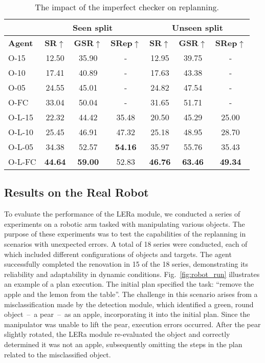 \documentclass[letterpaper, 10 pt, conference]{ieeeconf}  %
\begin{document}
\begin{table}
\caption{The impact of the imperfect checker on replanning.}
\centering
\small
\begin{tabular}{lcccccc}
\toprule
& \multicolumn{3}{c}{\textbf{Seen split}} & \multicolumn{3}{c}{\textbf{Unseen split}} \\ \toprule
\textbf{Agent} & \textbf{SR$\uparrow$} & \textbf{GSR$\uparrow$} & \textbf{SRep$\uparrow$} & \textbf{SR$\uparrow$} & \textbf{GSR$\uparrow$} & \textbf{SRep$\uparrow$} \\
\midrule
O-15 & 12.50 & 35.90 & - & 12.95 & 39.75 & - \\
O-10 & 17.41 & 40.89 & - & 17.63 & 43.38 & - \\
O-05 & 24.55 & 45.01 & - & 24.82 & 47.54 & - \\
O-FC   & 33.04  & 50.04 & - & 31.65 & 51.71 & - \\ \midrule
O-L-15   & 22.32 & 44.42 & 35.48 & 20.50 & 45.29 & 25.00 \\
O-L-10   & 25.45 & 46.91 & 47.32 & 25.18 & 48.95 & 28.70 \\
O-L-05   & 34.38 & 52.57 & \textbf{54.16} & 35.97 & 55.76 & 35.43 \\
O-L-FC     & \textbf{44.64} & \textbf{59.00} & 52.83 & \textbf{46.76} & \textbf{63.46} & \textbf{49.34} \\ \bottomrule
\end{tabular}
\label{tab:not_ideal_checkers}
\vspace{-20pt}
\end{table}


\subsection{Results on the Real Robot}
To evaluate the performance of the LERa module, we conducted a series of experiments on a robotic arm tasked with manipulating various objects. The purpose of these experiments was to test the capabilities of the replanning in scenarios with unexpected  errors. A total of 18 series were conducted, each of which included different configurations of objects and targets. The agent successfully completed the renovation in 15 of the 18 series, demonstrating its reliability and adaptability in dynamic conditions.
Fig.~\ref{fig:robot_run} illustrates an example of a plan execution. The initial plan specified the task: ``remove the apple and the lemon from the table''. The challenge in this scenario arises from a misclassification made by the detection module, which identified a green, round object~--~a pear~--~as an apple, incorporating it into the initial plan. Since the manipulator was unable to lift the pear, execution errors occurred. After the pear slightly rotated, the LERa module re-evaluated the object and correctly determined it was not an apple, subsequently omitting the steps in the plan related to the misclassified object. 
\end{document}
